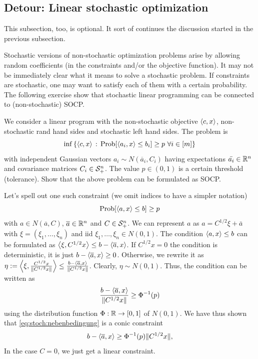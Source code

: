 \subsection{Detour: Linear stochastic optimization}

This subsection, too, is optional. It sort of continues the discussion started in the previous subsection. 

Stochastic versions of non-stochastic optimization problems arise by allowing random coefficients (in the constraints and/or the objective function). It may not be immediately clear what it means to solve a stochastic problem. If constraints are stochastic, one may want to satisfy each of them with a certain probability. The following exercise show that stochastic linear programming can be connected to (non-stochastic) SOCP.

\newcommand{\oa}{\overline{a}}

\begin{exercise}
	 We consider a linear program with the non-stochastic objective $\left\langle c , x \right\rangle$, non-stochastic rand hand sides and stochastic left hand sides. The problem is 
	\[
		\inf \left\{  \left\langle c , x \right\rangle  \,:\,  \operatorname{Prob} [ \left\langle a_i , x \right\rangle \le b_i ] \ge p \ \forall i \in [m] \right\}
	\]
	with independent Gaussian vectors $a_i \sim N(\oa_i,C_i)$ having expectations $\bar{a_i} \in \mathbb{R}^n$ and covariance matrices $C_i \in \mathcal{S}_+^n$. The value $p \in (0,1)$ is a certain threshold (tolerance).
	Show that the above problem can be formulated as SOCP. 
\end{exercise}
\begin{solution}
Let's spell out one such constraint (we omit indices to have a simpler notation)
\begin{equation}
\label{eq:stoch:nebenbedingung}
\operatorname{Prob}[ \left\langle a , x \right\rangle \le b ] \ge p
\end{equation}
with $a \in N(\oa,C)$, $\oa \in \R^n$ and $C \in \mathcal{S}_+^n$. We can represent $a$ as $a = C^{1/2} \xi + \bar{a}$ with $\xi = (\xi_1,\ldots,\xi_n)$ and  iid $\xi_1,\ldots,\xi_n \in N(0,1)$. The condition $\left\langle a , x \right\rangle  \le b$ can be formulated as $\sprod{\xi}{C^{1/2} x} \le b - \sprod{\oa}{x}$. If $C^{1/2} x = 0$ the condition is deterministic, it is just $b - \sprod{\oa}{x} \ge 0$. Otherwise, we rewrite it as $\eta:= \sprod{\xi}{ \frac{C^{1/2} x}{\| C^{1/2} x \|}} \le \frac{b-\sprod{\oa}{x}}{\| C^{1/2} x \|}$. Clearly, $\eta \sim N(0,1)$. Thus, the condition can be written as
\[
\frac{b - \sprod{\oa}{x}}{\| C^{1/2} x \|} \ge \Phi^{-1} (p)
\]
using the distribution function $\Phi : \mathbb{R} \to [0,1]$ of $N(0,1)$. We have thus shown that \eqref{eq:stoch:nebenbedingung} is a conic constraint
\[
b - \sprod{\oa}{x} \ge \Phi^{-1}(p) \| C^{1/2} x \|,
\]
In the case $C = 0$, we just get a linear constraint. 
\end{solution}





